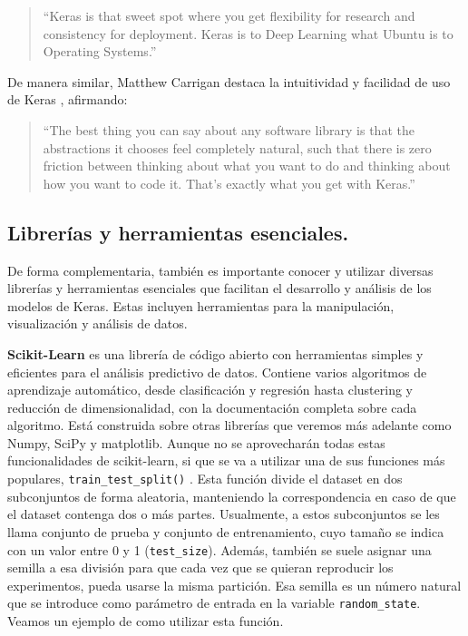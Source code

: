\begin{quote} 
``Keras is that sweet spot where you get flexibility for research and consistency for deployment. Keras is to Deep Learning what Ubuntu is to Operating Systems.'' 
\end{quote}

De manera similar, Matthew Carrigan destaca la intuitividad y facilidad de uso de Keras \citep{keraswebsite}, afirmando:

\begin{quote}
``The best thing you can say about any software library is that the abstractions it chooses feel completely natural, such that there is zero friction between thinking about what you want to do and thinking about how you want to code it. That's exactly what you get with Keras.''
\end{quote}


\subsection{Librerías y herramientas esenciales.} \label{sec:2.3.2}

De forma complementaria, también es importante conocer y utilizar diversas librerías y herramientas esenciales que facilitan el desarrollo y análisis de los modelos de Keras. Estas incluyen herramientas para la manipulación, visualización y análisis de datos.

\textbf{Scikit-Learn} \citep{scikitlearn} es una librería de código abierto con herramientas simples y eficientes para el análisis predictivo de datos. Contiene varios algoritmos de aprendizaje automático, desde clasificación y regresión hasta clustering y reducción de dimensionalidad, con la documentación completa sobre cada algoritmo. Está construida sobre otras librerías que veremos más adelante como Numpy, SciPy y matplotlib. Aunque no se aprovecharán todas estas funcionalidades de scikit-learn, si que se va a utilizar una de sus funciones más populares, \texttt{train\_test\_split()} \citep{traintestsplit}. Esta función divide el dataset en dos subconjuntos de forma aleatoria, manteniendo la correspondencia en caso de que el dataset contenga dos o más partes. Usualmente, a estos subconjuntos se les llama conjunto de prueba y conjunto de entrenamiento, cuyo tamaño se indica con un valor entre 0 y 1 (\texttt{test\_size}). Además, también se suele asignar una semilla a esa división para que cada vez que se quieran reproducir los experimentos, pueda usarse la misma partición. Esa semilla es un número natural que se introduce como parámetro de entrada en la variable \texttt{random\_state}. Veamos un ejemplo de como utilizar esta función.


